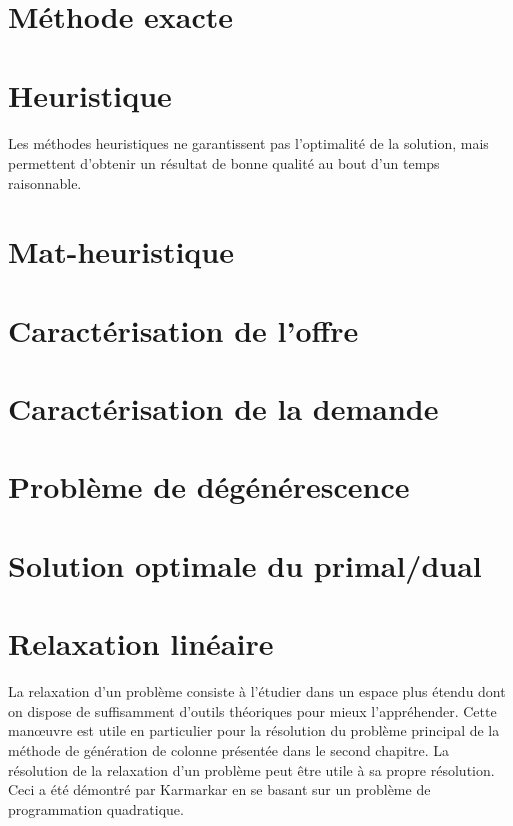 \documentclass{article}
\begin{document}
\section{Méthode exacte}

\section{Heuristique}

\paragraph{}
Les méthodes heuristiques ne garantissent pas l'optimalité de la solution, mais permettent d'obtenir un résultat de bonne qualité au bout d'un temps raisonnable.

\section{Mat-heuristique}

\section{Caractérisation de l'offre}

\section{Caractérisation de la demande}

\section{Problème de dégénérescence}

\section{Solution optimale du primal/dual}

\section{Relaxation linéaire}
La relaxation d'un problème consiste à l'étudier dans un espace plus étendu dont on dispose de suffisamment d'outils théoriques pour mieux l'appréhender. Cette manœuvre est utile en particulier pour la résolution du problème principal de la méthode de génération de colonne présentée dans le second chapitre. La résolution de la relaxation d'un problème peut être utile à sa propre résolution. Ceci a été démontré par Karmarkar \cite{Karmarkar} en se basant sur un problème de programmation quadratique.
\end{document}
